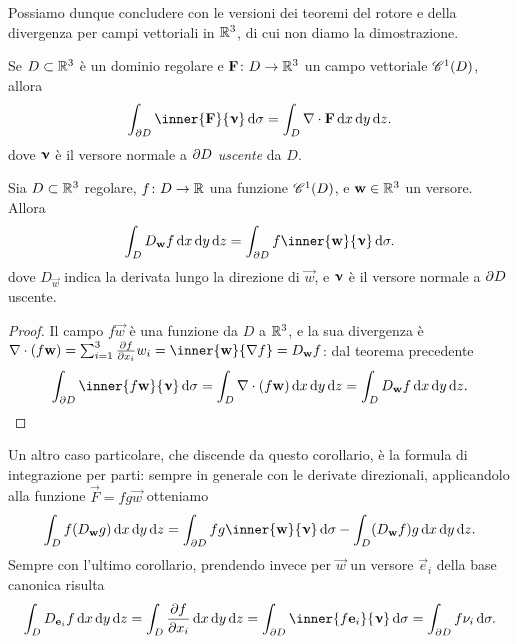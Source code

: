 Possiamo dunque concludere con le versioni dei teoremi del rotore e della divergenza per campi vettoriali in $\R^3$, di cui non diamo la dimostrazione.
\begin{teorema} \label{t:divergenza-R3}
	Se $D\subset\R^3$ è un dominio regolare e $\vec F\colon D\to\R^3$ un campo vettoriale $\cont[1]{D}$, allora
	\begin{equation}
		\int_{\boundary D}\inner{\vec F}{\vnu}\,\dd\sigma=\int_D\div\vec F\,\dd x\,\dd y\,\dd z.
		\label{eq:divergenza-R3}
	\end{equation}
	dove $\vnu$ è il versore normale a $\boundary D$ \emph{uscente} da $D$.
\end{teorema}
\begin{corollario}
	Sia $D\subset\R^3$ regolare, $f\colon D\to\R$ una funzione $\cont[1]{D}$, e $\vec w\in\R^3$ un versore.
	Allora
	\begin{equation}
		\int_DD_{\vec w}f\,\dd x\,\dd y\,\dd z=\int_{\boundary D}f\inner{\vec w}{\vnu}\,\dd\sigma.
	\end{equation}
	dove $D_{\vec w}$ indica la derivata lungo la direzione di $\vec w$, e $\vnu$ è il versore normale a $\boundary D$ uscente.
\end{corollario}
\begin{proof}
	Il campo $f\vec w$ è una funzione da $D$ a $\R^3$, e la sua divergenza è $\div(f\vec w)=\sum_{i=1}^3\drp{f}{x_i}w_i=\inner{\vec w}{\grad f}=D_{\vec w}f$: dal teorema precedente
	\begin{equation}
		\int_{\boundary D}\inner{f\vec w}{\vnu}\,\dd\sigma=\int_D\div(f\vec w)\,\dd x\,\dd y\,\dd z=\int_DD_{\vec w}f\,\dd x\,\dd y\,\dd z.\qedhere
	\end{equation}
\end{proof}
Un altro caso particolare, che discende da questo corollario, è la formula di integrazione per parti: sempre in generale con le derivate direzionali, applicandolo alla funzione $\vec F=fg\vec w$ otteniamo
\begin{equation}
	\int_Df(D_{\vec w}g)\,\dd x\,\dd y\,\dd z=\int_{\boundary D}fg\inner{\vec w}{\vnu}\,\dd\sigma-\int_D(D_{\vec w}f)g\,\dd x\,\dd y\,\dd z.
\end{equation}
Sempre con l'ultimo corollario, prendendo invece per $\vec w$ un versore $\vec e_i$ della base canonica risulta
\begin{equation}
	\int_DD_{\vec e_i}f\,\dd x\,\dd y\,\dd z=\int_D\drp{f}{x_i}\,\dd x\,\dd y\,\dd z=\int_{\boundary D}\inner{f\vec e_i}{\vnu}\,\dd\sigma=\int_{\boundary D}f\nu_i\,\dd\sigma.
\end{equation}
